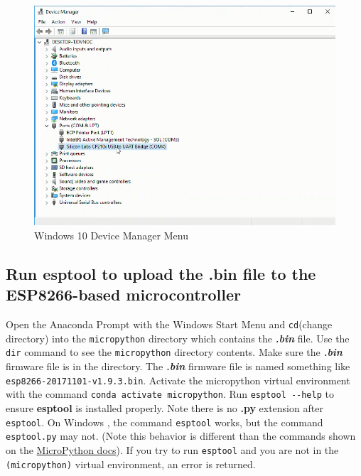 \documentclass{book}
\makeatletter
\def\maxwidth{\ifdim\Gin@nat@width>\linewidth\linewidth
    \else\Gin@nat@width\fi}
\let\Oldincludegraphics\includegraphics
\renewcommand{\includegraphics}[1]{\Oldincludegraphics[width=.8\maxwidth]{#1}}
\makeatother
\begin{document}
\begin{figure}
\centering
\includegraphics{images/device_manager_menu.png}
\caption{Windows 10 Device Manager Menu}
\end{figure}
    




    
        \subsection{Run esptool to upload the .bin file to the ESP8266-based
microcontroller}\label{run-esptool-to-upload-the-.bin-file-to-the-esp8266-based-microcontroller}
    




    
        Open the Anaconda Prompt with the Windows Start Menu and
\lstinline!cd!(change directory) into the \lstinline!micropython!
directory which contains the \textbf{\emph{.bin}} file. Use the
\lstinline!dir! command to see the \lstinline!micropython! directory
contents. Make sure the \textbf{\emph{.bin}} firmware file is in the
directory. The \textbf{\emph{.bin}} firmware file is named something
like \lstinline!esp8266-20171101-v1.9.3.bin!. Activate the micropython
virtual environment with the command
\lstinline!conda activate micropython!. Run \lstinline!esptool --help!
to ensure \textbf{esptool} is installed properly. Note there is no
\textbf{.py} extension after \lstinline!esptool!. On Windows , the
command \lstinline!esptool! works, but the command
\lstinline!esptool.py! may not. (Note this behavior is different than
the commands shown on the
\href{https://docs.micropython.org/en/latest/esp8266/esp8266/tutorial/intro.html\#deploying-the-firmware}{MicroPython
docs}). If you try to run \lstinline!esptool! and you are not in the
\lstinline!(micropython)! virtual environment, an error is returned.
\end{document}
